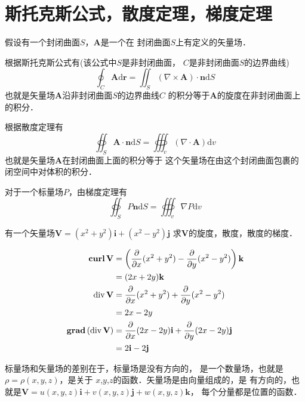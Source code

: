 \section{斯托克斯公式，散度定理，梯度定理}
假设有一个封闭曲面$S$，$\mathbf{A}$是一个在
封闭曲面$S$上有定义的矢量场．

根据斯托克斯公式有(该公式中$S$是非封闭曲面，
$C$是非封闭曲面$S$的边界曲线)
\[
  \oint_C \mathbf{A}\mathrm{d}\mathbf{r}=
  \iint_S (\nabla\times \mathbf{A})\cdot \mathbf{n}
  \mathrm{d}S
\]
也就是矢量场$\mathbf{A}$沿非封闭曲面$S$的边界曲线$C$
的积分等于$\mathbf{A}$的旋度在非封闭曲面上的积分．

根据散度定理有
\[
  \oiint_S \mathbf{A}\cdot \mathbf{n}\mathrm{d}S=
  \oiiint_v(\nabla \cdot \mathbf{A})\mathrm{d}v 
\]
也就是矢量场$\mathbf{A}$在封闭曲面上面的积分等于
这个矢量场在由这个封闭曲面包裹的闭空间中对体积的积分．

对于一个标量场$P$，由梯度定理有
\[
  \oiint_S P \mathbf{n}\mathrm{d}S=
  \oiiint_v\nabla P \mathrm{d} v 
\]

\begin{example}
有一个矢量场$\mathbf{V}=(x^2+y^2)\mathbf{i}+
(x^2-y^2)\mathbf{j}$
求$\mathbf{V}$的旋度，散度，散度的梯度．

\begin{equation*}
  \begin{split}
    \mathbf{curl}\,\mathbf{V}&= \left(\frac{\partial}{\partial x} (x^2+y^2)-
    \frac{\partial }{\partial y}(x^2-y^2)\right)\mathbf{k} \\ 
                   &=(2x+2y)\mathbf{k}\\
    \operatorname*{div}\mathbf{V}&=\frac{\partial }{\partial x}(x^2+y^2)+
    \frac{\partial }{\partial y}(x^2-y^2) \\ 
    &=2x-2y\\
\mathbf{grad}\, (\operatorname*{div} \mathbf{V})&=\frac{\partial}{\partial x}(2x-2y)\mathbf{i}+\frac{\partial}{\partial y}(2x-2y)
\mathbf{j}\\
&=2\mathbf{i}-2\mathbf{j}
\end{split}
\end{equation*}
\end{example}

\begin{notice}
  标量场和矢量场的差别在于，标量场是没有方向的，
  是一个数量场，也就是$\rho=\rho(x,y,z)$，是关于
  $x $,$y $,$z$的函数．矢量场是由向量组成的，是
  有方向的，也就是$\mathbf{V}=u(x,y,z)\mathbf{i}+
  v(x,y,z)\mathbf{j}+w(x,y,z)\mathbf{k}$，
  每个分量都是位置的函数．
\end{notice}

